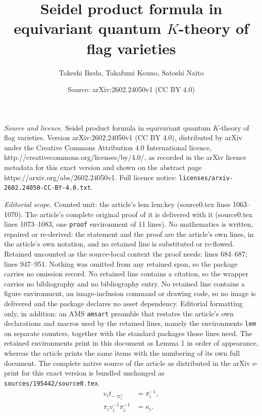 \documentclass[10pt,a4paper]{amsart}
\title{Seidel product formula in equivariant quantum $K$-theory of flag varieties}
\author{Takeshi Ikeda, Takafumi Kouno, Satoshi Naito}
\date{Source: arXiv:2602.24050v1 (CC BY 4.0)}
\newcommand{\miw}[1]{v_{#1}}
\begin{document}
\maketitle

\noindent\emph{Source and licence.} Seidel product formula in equivariant quantum $K$-theory of flag varieties. Version arXiv:2602.24050v1 (CC BY 4.0), distributed by arXiv under the Creative Commons Attribution 4.0 International licence, http://creativecommons.org/licenses/by/4.0/, as recorded in the arXiv licence metadata for this exact version and shown on the abstract page https://arxiv.org/abs/2602.24050v1. Full licence notice: \texttt{licenses/arxiv-2602.24050-CC-BY-4.0.txt}.\par\smallskip

\noindent\textit{Editorial scope.} Counted unit: the article's lem lem:key (source0.tex lines 1063--1070). The article's complete original proof of it is delivered with it (source0.tex lines 1073--1083, one \texttt{proof} environment of 11 lines). No mathematics is written, repaired or re-derived: the statement and the proof are the article's own lines, in the article's own notation, and no retained line is substituted or re-flowed.  Retained uncounted as the source-local context the proof needs: lines 684--687; lines 947--951.  Nothing was omitted from any retained span, so the package carries no omission record.  No retained line contains a citation, so the wrapper carries no bibliography and no bibliography entry.  No retained line contains a figure environment, an image-inclusion command or drawing code, so no image is delivered and the package declares no asset dependency.  Editorial formatting only, in addition: an AMS \texttt{amsart} preamble that restates the article's own declarations and macros used by the retained lines, namely the environments \texttt{lem} on separate counters, together with the standard packages those lines need.  The retained environments print in this document as Lemma 1 in order of appearance, whereas the article prints the same items with the numbering of its own full document.  The complete native source of the article as distributed in the arXiv e-print for this exact version is bundled unchanged as \texttt{sources/195442/source0.tex}.
\begin{align}
\miw{i}t_{-\varpi_i^\lor}&=\pi_i^{-1},\label{eq:pi inverse}\\
\pi_i\miw{i}^{-1}\pi_i^{-1}&=\kappa_i\label{eq:min-i and kappa}.
\end{align} 
\end{document}
